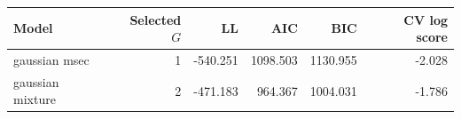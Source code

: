 \begin{tabular}{lrrrrr}
\toprule
Model & Selected $G$ & LL & AIC & BIC & CV log score \\
\midrule
gaussian msec & 1 & -540.251 & 1098.503 & 1130.955 & -2.028 \\
gaussian mixture & 2 & -471.183 & 964.367 & 1004.031 & -1.786 \\
\bottomrule
\end{tabular}
